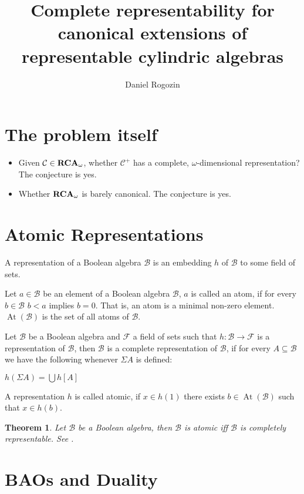 \documentclass[a4paper]{article}
\author{Daniel Rogozin}
\date{}
\title{Complete representability for canonical extensions of representable cylindric algebras}
\theoremstyle{defin}
\theoremstyle{theorem}
\newtheorem{theorem}{Theorem}
\theoremstyle{claim}
\theoremstyle{prop}
\theoremstyle{lemma}
\theoremstyle{fact}
\theoremstyle{ex}
\theoremstyle{col}
\begin{document}
\maketitle

\section{The problem itself}

\begin{itemize}
\item Given $\mathcal{C} \in {\bf RCA}_{\omega}$, whether $\mathcal{C}^{+}$ has a complete, $\omega$-dimensional representation? The conjecture is yes. \cite{hirsch2002relation}
\item Whether ${\bf RCA}_{\omega}$ is barely canonical. The conjecture is yes.
\end{itemize}
\section{Atomic Representations}

A representation of a Boolean algebra $\mathcal{B}$ is an embedding $h$ of $\mathcal{B}$ to some field of sets.

Let $a \in \mathcal{B}$ be an element of a Boolean algebra $\mathcal{B}$, $a$ is called an atom, if for every $b \in \mathcal{B}$
$b < a$ implies $b = 0$. That is, an atom is a minimal non-zero element. $\operatorname{At}(\mathcal{B})$ is the set of all atoms
of $\mathcal{B}$.

Let $\mathcal{B}$ be a Boolean algebra and $\mathcal{F}$ a field of sets such that $h : \mathcal{B} \to \mathcal{F}$ is a
representation of $\mathcal{B}$, then $\mathcal{B}$ is a complete representation of $\mathcal{B}$, if for every
$A \subseteq \mathcal{B}$ we have the following whenever $\Sigma A$ is defined:
\begin{center}
  $h(\Sigma A) = \bigcup h[A]$
\end{center}

A representation $h$ is called atomic, if $x \in h(1)$ there exists $b \in \operatorname{At}(\mathcal{B})$ such that $x \in h(b)$.

\begin{theorem} \label{completeboolean}
  Let $\mathcal{B}$ be a Boolean algebra, then $\mathcal{B}$ is atomic iff $\mathcal{B}$ is completely representable. See \cite[Corollary 6]{hirsch1997complete}.
\end{theorem}

\section{BAOs and Duality}
\end{document}
